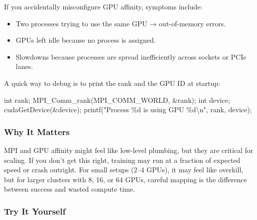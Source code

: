 \documentclass[
  letterpaper,
  DIV=11,
  numbers=noendperiod]{scrreprt}
\newenvironment{Shaded}{\begin{snugshade}}{\end{snugshade}}
\newcommand{\DataTypeTok}[1]{\textcolor[rgb]{0.68,0.00,0.00}{#1}}
\newcommand{\NormalTok}[1]{\textcolor[rgb]{0.00,0.23,0.31}{#1}}
\newcommand{\OperatorTok}[1]{\textcolor[rgb]{0.37,0.37,0.37}{#1}}
\newcommand{\SpecialCharTok}[1]{\textcolor[rgb]{0.37,0.37,0.37}{#1}}
\newcommand{\StringTok}[1]{\textcolor[rgb]{0.13,0.47,0.30}{#1}}
\providecommand{\tightlist}{%
  \setlength{\itemsep}{0pt}\setlength{\parskip}{0pt}}
\begin{document}
If you accidentally misconfigure GPU affinity, symptoms include:

\begin{itemize}
\tightlist
\item
  Two processes trying to use the same GPU → out-of-memory errors.
\item
  GPUs left idle because no process is assigned.
\item
  Slowdowns because processes are spread inefficiently across sockets or
  PCIe lanes.
\end{itemize}

A quick way to debug is to print the rank and the GPU ID at startup:

\begin{Shaded}
\begin{Highlighting}[]
\DataTypeTok{int}\NormalTok{ rank}\OperatorTok{;}
\NormalTok{MPI\_Comm\_rank}\OperatorTok{(}\NormalTok{MPI\_COMM\_WORLD}\OperatorTok{,} \OperatorTok{\&}\NormalTok{rank}\OperatorTok{);}
\DataTypeTok{int}\NormalTok{ device}\OperatorTok{;}
\NormalTok{cudaGetDevice}\OperatorTok{(\&}\NormalTok{device}\OperatorTok{);}
\NormalTok{printf}\OperatorTok{(}\StringTok{"Process }\SpecialCharTok{\%d}\StringTok{ is using GPU }\SpecialCharTok{\%d\textbackslash{}n}\StringTok{"}\OperatorTok{,}\NormalTok{ rank}\OperatorTok{,}\NormalTok{ device}\OperatorTok{);}
\end{Highlighting}
\end{Shaded}

\subsubsection{Why It Matters}\label{why-it-matters-47}

MPI and GPU affinity might feel like low-level plumbing, but they are
critical for scaling. If you don't get this right, training may run at a
fraction of expected speed or crash outright. For small setups (2--4
GPUs), it may feel like overkill, but for larger clusters with 8, 16, or
64 GPUs, careful mapping is the difference between success and wasted
compute time.

\subsubsection{Try It Yourself}\label{try-it-yourself-60}
\end{document}
